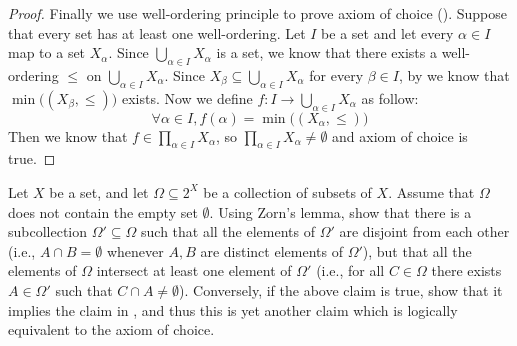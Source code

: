 \begin{proof}
  Finally we use well-ordering principle to prove axiom of choice ().
  Suppose that every set has at least one well-ordering.
  Let \(I\) be a set and let every \(\alpha \in I\) map to a set \(X_{\alpha}\).
  Since \(\bigcup_{\alpha \in I} X_{\alpha}\) is a set, we know that there exists a well-ordering \(\leq\) on \(\bigcup_{\alpha \in I} X_{\alpha}\).
  Since \(X_{\beta} \subseteq \bigcup_{\alpha \in I} X_{\alpha}\) for every \(\beta \in I\), by  we know that \(\min\big((X_{\beta}, \leq)\big)\) exists.
  Now we define \(f : I \to \bigcup_{\alpha \in I} X_{\alpha}\) as follow:
  \[
    \forall \alpha \in I, f(\alpha) = \min\big((X_{\alpha}, \leq)\big)
  \]
  Then we know that \(f \in \prod_{\alpha \in I} X_{\alpha}\), so \(\prod_{\alpha \in I} X_{\alpha} \neq \emptyset\) and axiom of choice is true.
\end{proof}

\begin{ex}\label{i:ex:8.5.20}
  Let \(X\) be a set, and let \(\Omega \subseteq 2^X\) be a collection of subsets of \(X\).
  Assume that \(\Omega\) does not contain the empty set \(\emptyset\).
  Using Zorn's lemma, show that there is a subcollection \(\Omega' \subseteq \Omega\) such that all the elements of \(\Omega'\) are disjoint from each other (i.e., \(A \cap B = \emptyset\) whenever \(A, B\) are distinct elements of \(\Omega'\)), but that all the elements of \(\Omega\) intersect at least one element of \(\Omega'\) (i.e., for all \(C \in \Omega\) there exists \(A \in \Omega'\) such that \(C \cap A \neq \emptyset\)).
  Conversely, if the above claim is true, show that it implies the claim in , and thus this is yet another claim which is logically equivalent to the axiom of choice.
\end{ex}

